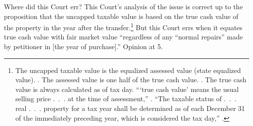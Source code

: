 \documentclass[12pt,\documentclassflag]{michiganCourtOfAppealsBrief}
\begin{document}

Where did this Court err? This Court's analysis of the issue is correct up to the proposition 
that the uncapped taxable value is based on the true cash value of the property in the year after the transfer.\footnote{The uncapped taxable value is the equalized assessed value (state equalized value). \cite{MCL 211.27a(3)}. The assessed value is one half of the true cash value. \cite{MCL 211.27a(1)}. The true cash value is always calculated as of tax day. ```true cash value' means the usual selling price .~.~. at the time of assessment,'' \cite{MCL 211.27(1)}. ``The taxable status of .~.~. real .~.~. property for a tax year shall be determined as of each December 31 of the immediately preceding year, which is considered the tax day,'' \cite{MCL 211.2(2)}.}
But this Court errs when it equates true cash value with fair market value ``regardless of any ``normal repairs'' made by petitioner in [the year of purchase].'' Opinion at 5.
\end{document}
